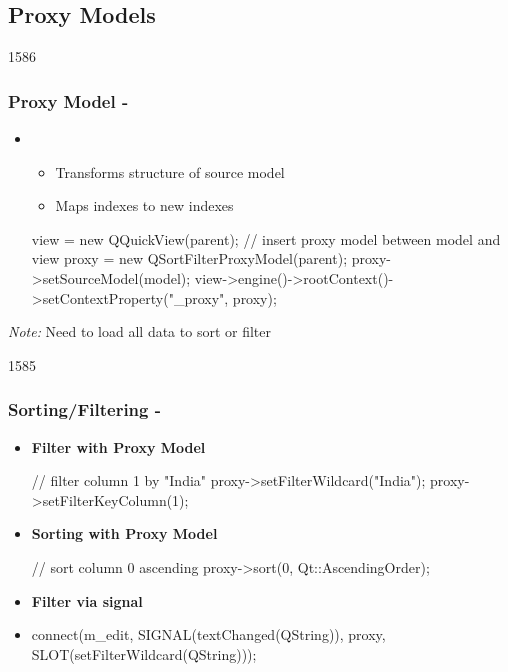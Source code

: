 %
%
%
%

\subsection{Proxy Models}
\begin{slide}[fragile]{1586}\frametitle{Proxy Model - }
  \begin{itemize}
  \item {}
    \begin{itemize}
    \item Transforms structure of source model
    \item Maps indexes to new indexes
    \end{itemize}
\begin{cpp}
view = new QQuickView(parent);
// insert proxy model between model and view
proxy = new QSortFilterProxyModel(parent);
proxy->setSourceModel(model);
view->engine()->rootContext()->setContextProperty("_proxy", proxy);
\end{cpp}
  \end{itemize}
\textit{Note:} Need to load all data to sort or filter
\end{slide}
\begin{slide}[fragile]{1585}\frametitle{Sorting/Filtering - }
  \begin{itemize}
  \item \textbf{Filter with Proxy Model}
\begin{cpp}
// filter column 1 by "India"
proxy->setFilterWildcard("India");
proxy->setFilterKeyColumn(1); 
\end{cpp}
\item \textbf{Sorting with Proxy Model}
\begin{cpp}
// sort column 0 ascending
proxy->sort(0, Qt::AscendingOrder);
\end{cpp}
  \end{itemize}
\medskip
\begin{itemize}
\item \textbf{Filter via  signal}
\item[]
\begin{cpp}
connect(m_edit, SIGNAL(textChanged(QString)),
proxy, SLOT(setFilterWildcard(QString)));
\end{cpp}
\end{itemize}
\end{slide}

